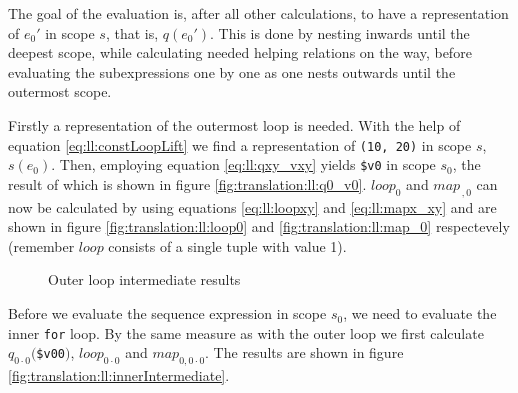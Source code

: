 The goal of the evaluation is, after all other calculations, to have a representation of $e_{0}'$ in scope $s$,
that is, $q(e_{0}')$. This is done by nesting inwards until the deepest scope, while calculating needed helping
relations on the way, before evaluating the subexpressions one by one as one nests outwards until the outermost
scope.

Firstly a representation of the outermost loop is needed. With the help of equation \ref{eq:ll:constLoopLift} we
find a representation of \texttt{(10, 20)} in scope $s$, $s(e_{0})$. Then, employing equation \ref{eq:ll:qxy_vxy}
yields \texttt{\$v0} in scope $s_{0}$, the result of which is shown in figure \ref{fig:translation:ll:q0_v0}.
$loop_{0}$ and $map_{\, ,0}$ can now be calculated by using equations \ref{eq:ll:loopxy} and \ref{eq:ll:mapx_xy}
and are shown in figure \ref{fig:translation:ll:loop0} and \ref{fig:translation:ll:map_0} respectevely (remember
$loop$ consists of a single tuple with value 1).

\begin{figure}[!h]
\centering
{}
\qquad \quad
{}
\qquad \quad
{}
\label{fig:translation:ll:outerIntermediate}
\caption{Outer loop intermediate results}
\end{figure}

Before we evaluate the sequence expression in scope $s_0$, we need to evaluate the inner \texttt{for} loop. By the
same measure as with the outer loop we first calculate $q_{0\cdot 0}($\texttt{\$v00}$)$, $loop_{0 \cdot 0}$ and
$map_{0, 0 \cdot 0}$. The results are shown in figure \ref{fig:translation:ll:innerIntermediate}.

